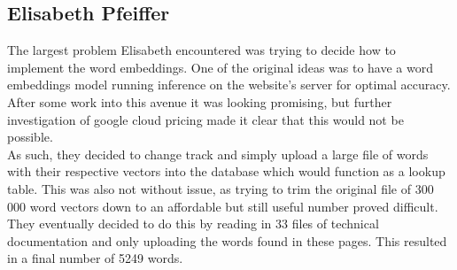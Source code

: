 \subsection{Elisabeth Pfeiffer}
The largest problem Elisabeth encountered was trying to decide how to implement the word embeddings. One of the original ideas was to have a word embeddings model running inference on the website's server for optimal accuracy. After some work into this avenue it was looking promising,  but further investigation of google cloud pricing made it clear that this would not be possible. \\
As such, they decided to change track and simply upload a large file of words with their respective vectors into the database which would function as a lookup table. This was also not without issue, as trying to trim the original file of 300 000 word vectors down to an affordable but still useful number proved difficult.
They eventually decided to do this by reading in 33 files of technical documentation and only uploading the words found in these pages. This resulted in a final number of 5249 words.
